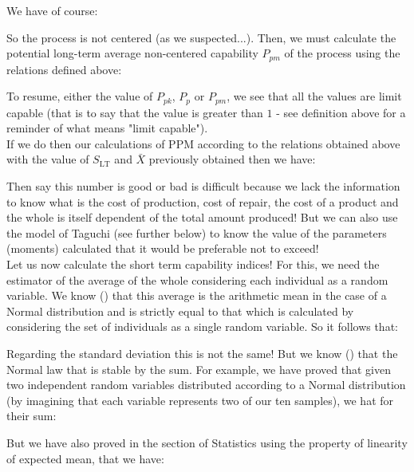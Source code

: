 	\pagebreak
	\begin{tcolorbox}[colframe=black,colback=white,sharp corners]
	We have of course:
	
	So the process is not centered (as we suspected...). Then, we must calculate the potential long-term average non-centered capability $P_{pm}$ of the process using the relations defined above:
	
	To resume, either the value of $P_{pk}$, $P_p$ or $P_{pm}$, we see that all the values are limit capable (that is to say that the value is greater than $1$ - see definition above for a reminder of what means "limit capable").\\
	
	If we do then our calculations of PPM according to the relations obtained above with the value of $S_{\text{LT}}$ and $\bar{X}$ previously obtained then we have:
	
	Then say this number  is good or bad is difficult because we lack the information to know what is the cost of production, cost of repair, the cost of a product and the whole is itself dependent of the total amount produced! But we can also use the model of Taguchi (see further below) to know the value of the parameters (moments) calculated that it would be preferable not to exceed!\\
	
	Let us now calculate the short term capability indices! For this, we need the estimator of the average of the whole considering each individual as a random variable. We know () that this average is the arithmetic mean in the case of a Normal distribution and is strictly equal to that which is calculated by considering the set of individuals as a single random variable. So it follows that:
	
	Regarding the standard deviation this is not the same! But we know () that the Normal law that is stable by the sum. For example, we have proved that given two independent random variables distributed according to a Normal distribution (by imagining that each variable represents two of our ten samples), we hat for their sum:
	
	But we have also proved in the section of Statistics using the property of linearity of expected mean, that we have:
		
	\end{tcolorbox}

